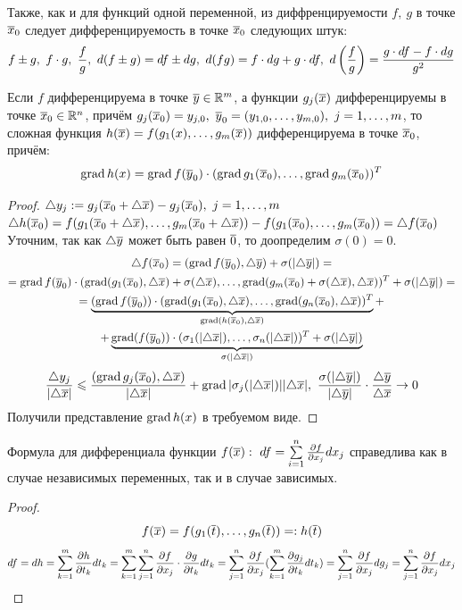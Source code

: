 \begin{note}
	Также, как и для функций одной переменной, из диффренцируемости $f,\ g$ в точке $\overline x_0$ следует дифференцируемость в точке $\overline x_0$ следующих штук:
	\[f\pm g,\ f\cdot g,\ \frac{f}{g},\ d(f\pm g)=df\pm dg,\ d(fg)=f\cdot dg+g\cdot df,\ d\l(\frac fg\r)=\frac{g\cdot df-f\cdot dg}{g^2}\]
\end{note}
\begin{theorem}
	Если $f$ дифференцируема в точке $\overline y\in\mathbb{R}^m$, а функции $g_j(\overline x)$ дифференцируемы в точке $\overline x_0\in\mathbb{R}^n$, причём $g_j(\overline x_0)=y_{j,0},\ \overline y_0=(y_{1,0},\dots,y_{m,0}),\ j=1,\dots,m$, то сложная функция $h(\overline x)=f(g_1(x),\dots,g_m(\overline x))$ дифференцируема в точке $\overline x_0$, причём:
	\[\operatorname{grad} h(x)=\operatorname{grad} f(\overline y_0)\cdot(\operatorname{grad} g_1(\overline x_0),\dots,\operatorname{grad} g_m(\overline x_0))^T\]
\end{theorem}
\begin{proof}
	$\triangle y_j:=g_j(\overline x_0+\triangle\overline x)-g_j(\overline x_0),\ j=1,\dots,m$\\
	$\triangle h(\overline x_0)=f(g_1(\overline x_0+\triangle\overline x),\dots,g_m(\overline x_0+\triangle\overline x))-f(g_1(\overline x_0),\dots,g_m(\overline x_0))=\triangle f(\overline x_0)$\\
	Уточним, так как $\triangle\overline y$ может быть равен $\overline0$, то доопределим $\sigma(0)=0$.
	\begin{multline*}
		\triangle f(\overline x_0)=(\operatorname{grad} f(\overline y_0),\triangle\overline y)+\sigma(|\triangle\overline y|)=\\
		=\operatorname{grad} f(\overline y_0)\cdot(\operatorname{grad} (g_1(\overline x_0),\triangle\overline x)+\sigma(\triangle\overline x),\dots,\operatorname{grad}(g_m(\overline x_0)+\sigma(\triangle\overline x),\triangle\overline x))^T+\sigma(|\triangle\overline y|)=\\
		=\underbrace{(\operatorname{grad} f(\overline y_0))\cdot(\operatorname{grad}(g_1(\overline x_0),\triangle\overline x),\dots,\operatorname{grad}(g_n(\overline x_0),\triangle\overline x))^T}_{\operatorname{grad}(h(\overline x_0),\triangle\overline x)}+\\
		+\underbrace{\operatorname{grad}(f(\overline y_0))\cdot(\sigma_1(|\triangle\overline x|),\dots,\sigma_n(|\triangle\overline x|))^T+\sigma(|\triangle\overline y|)}_{\sigma(|\triangle\overline x|)}
	\end{multline*}
	\[\frac{\triangle y_j}{|\triangle\overline x|}\leqslant\frac{(\operatorname{grad} g_j(\overline x_0),\triangle\overline x)}{|\triangle\overline x|}+\operatorname{grad}{|\sigma_j(|\triangle\overline x|)|}{|\triangle\overline x|},\ \frac{\sigma(|\triangle\overline y|)}{|\triangle\overline y|}\cdot\frac{\triangle\overline y}{\triangle\overline x}\rightarrow0\]
	Получили представление $\operatorname{grad} h(x)$ в требуемом виде.
\end{proof}
\begin{corollary}
	Формула для дифференциала функции $f(\v x):\ df=\sum_{i=1}^n\frac{\vd f}{\vd x_j}dx_j$ справедлива как в случае независимых переменных, так и в случае зависимых.
\end{corollary}
\begin{proof}
	\[f(\overline x)=f(g_1(\overline t),\dots,g_n(\overline t))=:h(\overline t)\]
	\[df=dh=\sum_{k=1}^m\frac{\vd h}{\vd t_k}dt_k=\sum_{k=1}^m\sum_{j=1}^n\frac{\vd f}{\vd x_j}\cdot\frac{\vd g}{\vd t_k}dt_k=\sum_{j=1}^n\frac{\vd f}{\vd x_j}(\sum_{k=1}^m\frac{\vd g_j}{\vd t_k}dt_k)=\sum_{j=1}^n\frac{\vd f}{\vd x_j}dg_j=\sum_{j=1}^n\frac{\vd f}{\vd x_j}dx_j\]
\end{proof}

